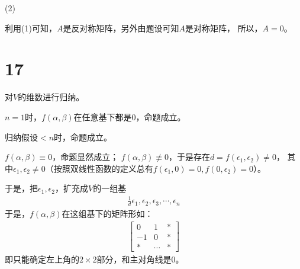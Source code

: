 \documentclass{article}
\begin{document}
(2)

利用(1)可知，$A$是反对称矩阵，另外由题设可知$A$是对称矩阵，
所以，$A = 0$。


\section*{17}

对$V$的维数进行归纳。

$n = 1$时，$f(\alpha, \beta)$在任意基下都是0，命题成立。

归纳假设$< n$时，命题成立。

$f(\alpha, \beta) \equiv 0$，命题显然成立；
$f(\alpha, \beta) \not \equiv 0$，于是存在$d = f(\epsilon_1, \epsilon_2) \neq 0$，
其中$\epsilon_1, \epsilon_2 \neq 0$（按照双线性函数的定义总有$f(\epsilon_1, 0) = 0, f(0, \epsilon_2) = 0$）。

于是，把$\epsilon_1, \epsilon_2 $，扩充成$V$的一组基
\begin{align*}
  \frac{1}{d} \epsilon_1, \epsilon_2, \epsilon_3, \cdots, \epsilon_n
\end{align*}
于是，$f(\alpha, \beta)$在这组基下的矩阵形如：
\begin{align*}
  \begin{bmatrix}
    0   & 1      & * \\
    - 1 & 0      & * \\
    *   & \cdots & *
  \end{bmatrix}
\end{align*}
即只能确定左上角的$2 \times 2$部分，和主对角线是0。
\end{document}
